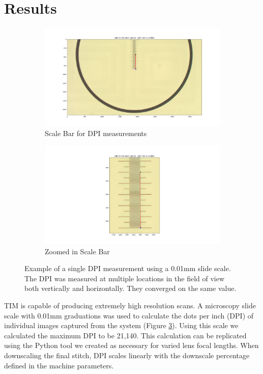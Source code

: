 \documentclass[a4paper,12pt]{article}
\begin{document}
\section{Results}

\begin{figure}
  \centering
  \begin{subfigure}{.5\textwidth}
    \centering
    \includegraphics[height=0.5\linewidth]{../diagrams/dpi_measurement_whole.png}
    \caption{Scale Bar for DPI measurements}
    \label{fig:dpi_measurement_whole}
  \end{subfigure}%
  \begin{subfigure}{.5\textwidth}
    \centering
    \includegraphics[height=0.5\linewidth]{../diagrams/dpi_measurement_zoomed_2.png}
    \caption{Zoomed in Scale Bar}
    \label{fig:dpi_measurement_zoomed}
  \end{subfigure}
  \caption{Example of a single DPI measurement using a 0.01mm slide scale. The DPI was measured at multiple locations in the field of view both vertically and horizontally. They converged on the same value.}
  \label{fig:dpi_measurements}
\end{figure}

TIM is capable of producing extremely high resolution scans.
A microscopy slide scale with 0.01mm graduations was used to calculate the dots per inch (DPI) of individual images captured from the system (Figure \ref{fig:dpi_measurements}).  
Using this scale we calculated the maximum DPI to be 21,140. This calculation can be replicated using the Python tool we created as necessary for varied lens focal lengths. When downscaling the final stitch, 
DPI scales linearly with the downscale percentage defined in the machine parameters. 
\end{document}
